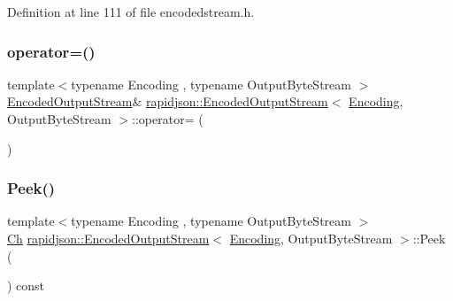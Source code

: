 Definition at line 111 of file encodedstream.\+h.


\begin{DoxyCode}{0}

\end{DoxyCode}
\mbox{\label{classrapidjson_1_1_encoded_output_stream_a239ae151f2510bc8d2053b228e7b7949}} 
\subsubsection{\texorpdfstring{operator=()}{operator=()}}
{\footnotesize\ttfamily template$<$typename Encoding , typename Output\+Byte\+Stream $>$ \\
\mbox{\hyperlink{classrapidjson_1_1_encoded_output_stream}{Encoded\+Output\+Stream}}\& \mbox{\hyperlink{classrapidjson_1_1_encoded_output_stream}{rapidjson\+::\+Encoded\+Output\+Stream}}$<$ \mbox{\hyperlink{classrapidjson_1_1_encoding}{Encoding}}, Output\+Byte\+Stream $>$\+::operator= (\begin{DoxyParamCaption}\item[{const \mbox{\hyperlink{classrapidjson_1_1_encoded_output_stream}{Encoded\+Output\+Stream}}$<$ \mbox{\hyperlink{classrapidjson_1_1_encoding}{Encoding}}, Output\+Byte\+Stream $>$ \&}]{ }\end{DoxyParamCaption})\hspace{0.3cm}{\ttfamily [private]}}

\mbox{\label{classrapidjson_1_1_encoded_output_stream_a8f7a07f454334646a679afa49c930e8e}} 
\subsubsection{\texorpdfstring{Peek()}{Peek()}}
{\footnotesize\ttfamily template$<$typename Encoding , typename Output\+Byte\+Stream $>$ \\
\mbox{\hyperlink{classrapidjson_1_1_encoded_output_stream_aa96ac761f570fbdbcc2375ad4edd8b6f}{Ch}} \mbox{\hyperlink{classrapidjson_1_1_encoded_output_stream}{rapidjson\+::\+Encoded\+Output\+Stream}}$<$ \mbox{\hyperlink{classrapidjson_1_1_encoding}{Encoding}}, Output\+Byte\+Stream $>$\+::Peek (\begin{DoxyParamCaption}{ }\end{DoxyParamCaption}) const}



